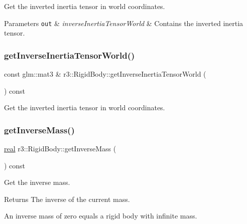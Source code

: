 Get the inverted inertia tensor in world coordinates. 


\begin{DoxyParams}[1]{Parameters}
\mbox{\tt out}  & {\em inverse\+Inertia\+Tensor\+World} & Contains the inverted inertia tensor. \\
\hline
\end{DoxyParams}
\mbox{\label{classr3_1_1_rigid_body_a03c55eb4a0df2ec179e621ed5de0919a}} 
\subsubsection{\texorpdfstring{get\+Inverse\+Inertia\+Tensor\+World()}{getInverseInertiaTensorWorld()}\hspace{0.1cm}{\footnotesize\ttfamily [2/2]}}
{\footnotesize\ttfamily const glm\+::mat3 \& r3\+::\+Rigid\+Body\+::get\+Inverse\+Inertia\+Tensor\+World (\begin{DoxyParamCaption}{ }\end{DoxyParamCaption}) const}



Get the inverted inertia tensor in world coordinates. 

\mbox{\label{classr3_1_1_rigid_body_a9a994b91ccc980c1dcc4ed43f71b6913}} 
\subsubsection{\texorpdfstring{get\+Inverse\+Mass()}{getInverseMass()}}
{\footnotesize\ttfamily \mbox{\hyperlink{namespacer3_ab2016b3e3f743fb735afce242f0dc1eb}{real}} r3\+::\+Rigid\+Body\+::get\+Inverse\+Mass (\begin{DoxyParamCaption}{ }\end{DoxyParamCaption}) const}



Get the inverse mass. 

\begin{DoxyReturn}{Returns}
The inverse of the current mass.
\end{DoxyReturn}
An inverse mass of zero equals a rigid body with infinite mass. \mbox{\label{classr3_1_1_rigid_body_a8a99ed119357d0cec8b77dfcb169dfab}} 

